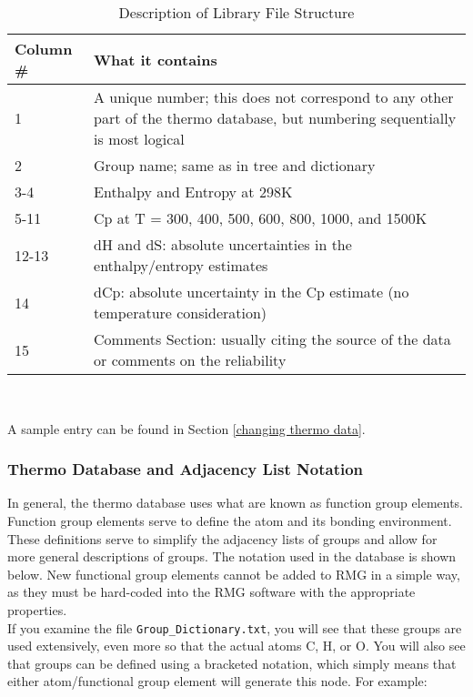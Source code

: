 \documentclass[12pt,letterpaper]{article}
\begin{document}
\begin{table}
\begin{tabular}{|l|p{11.1cm}|} \hline
Column \# & What it contains \\ \hline
1     & A unique number; this does not correspond to any other part of the thermo database, but numbering sequentially is most logical \\ \hline
2     & Group name; same as in tree and dictionary \\ \hline
3-4   & Enthalpy and Entropy at 298K \\ \hline
5-11  & Cp at T = 300, 400, 500, 600, 800, 1000, and 1500K \\ \hline
12-13 & dH and dS: absolute uncertainties in
the enthalpy/entropy estimates \\ \hline
14    & dCp: absolute uncertainty in the Cp estimate
(no temperature consideration) \\ \hline
15    & Comments Section: usually citing the source of
the data or comments on the reliability \\ \hline
\end{tabular} \\
\caption{Description of Library File Structure}
\label{library table}
\end{table}
A sample entry can be found in Section \ref{changing thermo data}.

\subsubsection{Thermo Database and Adjacency List Notation}

In general, the thermo database uses what are known as function group
elements. Function group elements serve to define the atom and its bonding
environment. These definitions serve to simplify the adjacency lists of groups
and allow for more general descriptions of groups. The notation used in the
database is shown below. New functional group elements cannot be added to
RMG in a simple way, as they must be hard-coded into the RMG software
with the appropriate properties.\\

If you examine the file \texttt{Group\_Dictionary.txt}, you will see that these groups
are used extensively, even more so that the actual atoms C, H, or O. You
will also see that groups can be defined using a bracketed notation, which
simply means that either atom/functional group element will generate this
node. For example:\\
\end{document}

